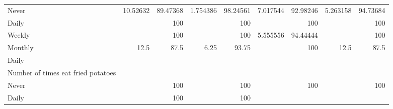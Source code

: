 \documentclass{article}
\begin{document}
\begin{tabular}{lllllllll}
\multicolumn{1}{l}{\hspace{7em}Never} &
  \multicolumn{1}{|r}{10.52632} &
  \multicolumn{1}{r}{89.47368} &
  \multicolumn{1}{r}{1.754386} &
  \multicolumn{1}{r}{98.24561} &
  \multicolumn{1}{r}{7.017544} &
  \multicolumn{1}{r}{92.98246} &
  \multicolumn{1}{r}{5.263158} &
  \multicolumn{1}{r}{94.73684} \\
\multicolumn{1}{l}{\hspace{7em}Daily} &
  \multicolumn{1}{|r}{} &
  \multicolumn{1}{r}{100} &
  \multicolumn{1}{r}{} &
  \multicolumn{1}{r}{100} &
  \multicolumn{1}{r}{} &
  \multicolumn{1}{r}{100} &
  \multicolumn{1}{r}{} &
  \multicolumn{1}{r}{100} \\
\multicolumn{1}{l}{\hspace{7em}Weekly} &
  \multicolumn{1}{|r}{} &
  \multicolumn{1}{r}{100} &
  \multicolumn{1}{r}{} &
  \multicolumn{1}{r}{100} &
  \multicolumn{1}{r}{5.555556} &
  \multicolumn{1}{r}{94.44444} &
  \multicolumn{1}{r}{} &
  \multicolumn{1}{r}{100} \\
\multicolumn{1}{l}{\hspace{7em}Monthly} &
  \multicolumn{1}{|r}{12.5} &
  \multicolumn{1}{r}{87.5} &
  \multicolumn{1}{r}{6.25} &
  \multicolumn{1}{r}{93.75} &
  \multicolumn{1}{r}{} &
  \multicolumn{1}{r}{100} &
  \multicolumn{1}{r}{12.5} &
  \multicolumn{1}{r}{87.5} \\
\multicolumn{1}{l}{\hspace{5em}Daily} &
  \multicolumn{1}{|r}{} &
  \multicolumn{1}{r}{} &
  \multicolumn{1}{r}{} &
  \multicolumn{1}{r}{} &
  \multicolumn{1}{r}{} &
  \multicolumn{1}{r}{} &
  \multicolumn{1}{r}{} &
  \multicolumn{1}{r}{} \\
\multicolumn{1}{l}{\hspace{6em}Number of times eat fried potatoes} &
  \multicolumn{1}{|r}{} &
  \multicolumn{1}{r}{} &
  \multicolumn{1}{r}{} &
  \multicolumn{1}{r}{} &
  \multicolumn{1}{r}{} &
  \multicolumn{1}{r}{} &
  \multicolumn{1}{r}{} &
  \multicolumn{1}{r}{} \\
\multicolumn{1}{l}{\hspace{7em}Never} &
  \multicolumn{1}{|r}{} &
  \multicolumn{1}{r}{100} &
  \multicolumn{1}{r}{} &
  \multicolumn{1}{r}{100} &
  \multicolumn{1}{r}{} &
  \multicolumn{1}{r}{100} &
  \multicolumn{1}{r}{} &
  \multicolumn{1}{r}{100} \\
\multicolumn{1}{l}{\hspace{7em}Daily} &
  \multicolumn{1}{|r}{} &
  \multicolumn{1}{r}{100} &
  \multicolumn{1}{r}{} &
  \multicolumn{1}{r}{100} &

\end{tabular}
\end{document}
